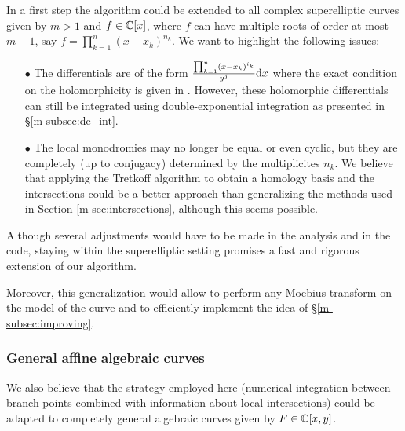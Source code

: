\documentclass[main.tex]{subfiles}
\begin{document}
  In a first step the algorithm could be
  extended to all complex superelliptic curves given by $m > 1$ and $f \in
  \mathbb{C}[x]$, where $f$ can have multiple roots of order at most $m-1$, say 
  $f = \prod_{k=1}^n (x-x_k)^{n_k}$.
  We want to highlight the following issues:
  \begin{itemize}
   \item[$\bullet$] The differentials are of the form
   $\frac{\prod_{k=1}^n (x-x_k)^{i_k}}{y^j}\mathrm d x$
    where the exact condition on the holomorphicity is given in \cite[Theorem 3]{Koo1991}.
   However, these holomorphic differentials can still be integrated using double-exponential integration as presented
   in \S \ref{m-subsec:de_int}.
   \item[$\bullet$] The local monodromies may no longer be equal or even cyclic, but they are completely (up
   to conjugacy) determined
   by the multiplicites $n_k$. We believe that applying the Tretkoff algorithm \cite{TT1984}
   to obtain a homology basis and the intersections could be a better approach than generalizing the methods
   used in Section \ref{m-sec:intersections}, although this seems possible.
  \end{itemize}

  Although several adjustments would have to be made in the analysis and in the
  code, staying within the superelliptic setting promises
  a fast and rigorous extension of our algorithm. 

  Moreover, this generalization would allow to perform any Moebius transform on the
  model of the curve and to efficiently implement the idea of \S \ref{m-subsec:improving}.

  \subsubsection{General affine algebraic curves}
  
  We also believe that the strategy employed here (numerical integration between
  branch points combined with information about local intersections) could
  be adapted to completely general algebraic curves given by $F \in \mathbb{C}[x,y]$.
\end{document}
